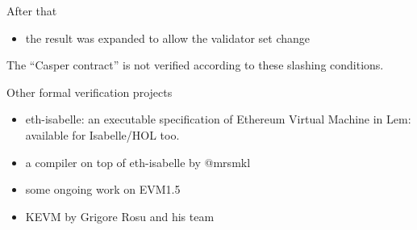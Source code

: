 \documentclass{beamer}
\begin{document}
\begin{frame}{After that}
  \begin{itemize}
  \item the result was expanded to allow the validator set change
  \end{itemize}

  The ``Casper contract'' is not verified according to these slashing conditions.
\end{frame}

\begin{frame}{Other formal verification projects}
\begin{itemize}
\item eth-isabelle: an executable specification of Ethereum Virtual Machine in Lem: available for Isabelle/HOL too.
\item a compiler on top of eth-isabelle by @mrsmkl
\item some ongoing work on EVM1.5
\item KEVM by Grigore Rosu and his team
\end{itemize}
\end{frame}
\end{document}
